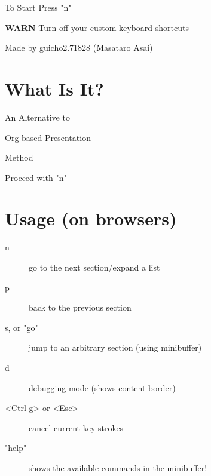 \begin{outline-text-1}
\begin{xlarge}
\begin{center}
To Start Press "n"
\end{center}
\end{xlarge}

\begin{center}
\textbf{WARN} Turn off your custom keyboard shortcuts
\end{center}

\begin{note}
\begin{alignright}
Made by guicho2.71828 (Masataro Asai)
\end{alignright}
\end{note}
\end{outline-text-1}

\section{What Is It?}
\label{sec-1}

\begin{xlarge}
An Alternative to
\begin{center}
Org-based Presentation
\end{center}
\begin{alignright}
Method
\end{alignright}
\end{xlarge}

\begin{center}
Proceed with "n"
\end{center}
\section{Usage (on browsers)}
\label{sec-2}

\begin{smaller}
\begin{description}
\item[{n}] go to the next section/expand a list
\item[{p}] back to the previous section
\item[{s, or "go"}] jump to an arbitrary section (using minibuffer)
\item[{d}] debugging mode (shows content border)
\item[{<Ctrl-g> or <Esc>}] cancel current key strokes
\item[{"help"}] shows the available commands in the minibuffer!
\end{description}
\end{smaller}
